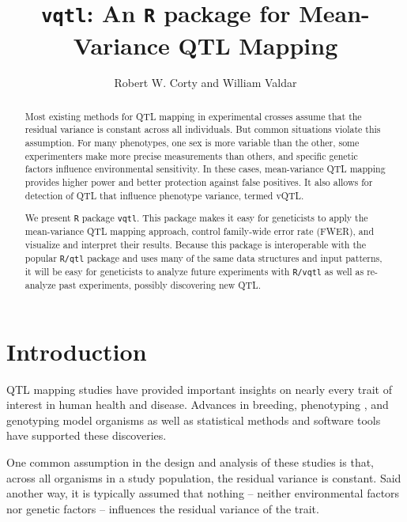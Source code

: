 \documentclass{article}
\title{\texttt{vqtl}: An \texttt{R} package for Mean-Variance QTL Mapping}
\author{Robert W. Corty and William Valdar}
\begin{document}
\maketitle


\begin{abstract}
Most existing methods for QTL mapping in experimental crosses assume that the residual variance is constant across all individuals.
But common situations violate this assumption.
For many phenotypes, one sex is more variable than the other, some experimenters make more precise measurements than others, and specific genetic factors influence environmental sensitivity.
In these cases, mean-variance QTL mapping provides higher power and better protection against false positives.
It also allows for detection of QTL that influence phenotype variance, termed vQTL.

We present \texttt{R} package \texttt{vqtl}.
This package makes it easy for geneticists to apply the mean-variance QTL mapping approach, control family-wide error rate (FWER), and visualize and interpret their results.
Because this package is interoperable with the popular \texttt{R/qtl} package and uses many of the same data structures and input patterns, it will be easy for geneticists to analyze future experiments with \texttt{R/vqtl} as well as re-analyze past experiments, possibly discovering new QTL.
\end{abstract}



\section{Introduction}

QTL mapping studies have provided important insights on nearly every trait of interest in human health and disease.
Advances in breeding, phenotyping \citep{Yang2014a}, and genotyping \citep{Williams1990} model organisms as well as statistical methods \citep{Lander1989a} and software tools \citep{Broman2003} have supported these discoveries.

One common assumption in the design and analysis of these studies is that, across all organisms in a study population, the residual variance is constant.
Said another way, it is typically assumed that nothing -- neither environmental factors nor genetic factors -- influences the residual variance of the trait.
\end{document}
